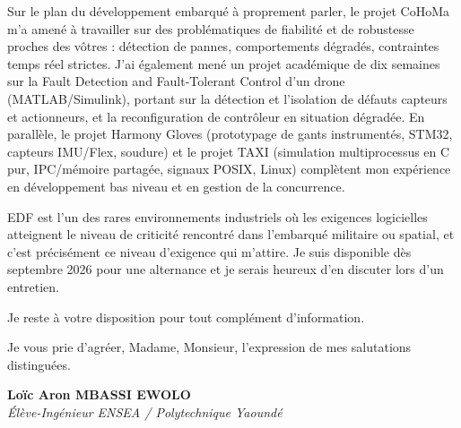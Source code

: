 \documentclass[a4paper,11pt]{article}
\begin{document}
Sur le plan du développement embarqué à proprement parler, le projet CoHoMa m'a amené à travailler sur des problématiques de fiabilité et de robustesse proches des vôtres : détection de pannes, comportements dégradés, contraintes temps réel strictes. J'ai également mené un projet académique de dix semaines sur la Fault Detection and Fault-Tolerant Control d'un drone (MATLAB/Simulink), portant sur la détection et l'isolation de défauts capteurs et actionneurs, et la reconfiguration de contrôleur en situation dégradée. En parallèle, le projet Harmony Gloves (prototypage de gants instrumentés, STM32, capteurs IMU/Flex, soudure) et le projet TAXI (simulation multiprocessus en C pur, IPC/mémoire partagée, signaux POSIX, Linux) complètent mon expérience en développement bas niveau et en gestion de la concurrence.

EDF est l'un des rares environnements industriels où les exigences logicielles atteignent le niveau de criticité rencontré dans l'embarqué militaire ou spatial, et c'est précisément ce niveau d'exigence qui m'attire. Je suis disponible dès septembre 2026 pour une alternance et je serais heureux d'en discuter lors d'un entretien.

Je reste à votre disposition pour tout complément d'information.

Je vous prie d'agréer, Madame, Monsieur, l'expression de mes salutations distinguées.

\vspace{0.8cm}

\textbf{Loïc Aron MBASSI EWOLO}\\
\textit{Élève-Ingénieur ENSEA / Polytechnique Yaoundé}
\end{document}
